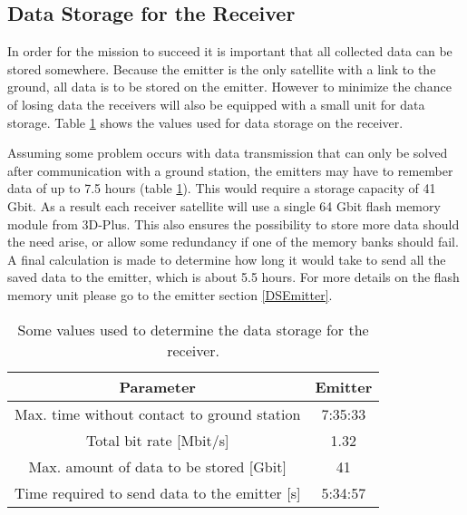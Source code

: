 \subsection{Data Storage for the Receiver}
\label{DSReceiver}

In order for the mission to succeed it is important that all collected data can be stored somewhere. Because the emitter is the only satellite with a link to the ground, all data is to be stored on the emitter. However to minimize the chance of losing data the receivers will also be equipped with a small unit for data storage. Table \ref{DSReceiverTable} shows the values used for data storage on the receiver. 

Assuming some problem occurs with data transmission that can only be solved after communication with a ground station, the emitters may have to remember data of up to 7.5 hours (table \ref{DSReceiverTable}). This would require a storage capacity of 41 Gbit. As a result each receiver satellite will use a single 64 Gbit flash memory module from 3D-Plus. This also ensures the possibility to store more data should the need arise, or allow some redundancy if one of the memory banks should fail. A final calculation is made to determine how long it would take to send all the saved data to the emitter, which is about 5.5 hours. For more details on the flash memory unit please go to the emitter section \ref{DSEmitter}.

\begin{table}
\centering
\begin{tabular}{c|c}
\textbf{Parameter}  & \textbf{Emitter} \\\hline\hline
	Max. time without contact to ground station & 7:35:33 \\
	Total bit rate [Mbit/s] & 1.32 \\
	Max. amount of data to be stored [Gbit] & 41 \\
	Time required to send data to the emitter [s] & 5:34:57 \\
\end{tabular}
\caption{Some values used to determine the data storage for the receiver.}
\label{DSReceiverTable}
\end{table}